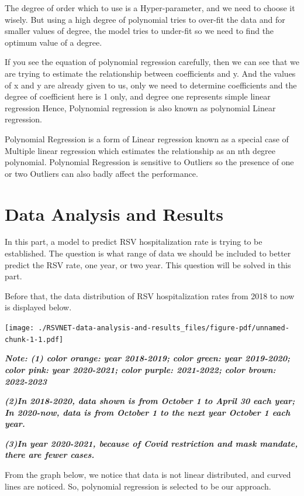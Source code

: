 \documentclass[
  letterpaper,
  DIV=11,
  numbers=noendperiod]{scrreport}
\begin{document}
The degree of order which to use is a Hyper-parameter, and we need to
choose it wisely. But using a high degree of polynomial tries to
over-fit the data and for smaller values of degree, the model tries to
under-fit so we need to find the optimum value of a degree.

If you see the equation of polynomial regression carefully, then we can
see that we are trying to estimate the relationship between coefficients
and y. And the values of x and y are already given to us, only we need
to determine coefficients and the degree of coefficient here is 1 only,
and degree one represents simple linear regression Hence, Polynomial
regression is also known as polynomial Linear regression.

Polynomial Regression is a form of Linear regression known as a special
case of Multiple linear regression which estimates the relationship as
an nth degree polynomial. Polynomial Regression is sensitive to Outliers
so the presence of one or two Outliers can also badly affect the
performance.


\hypertarget{data-analysis-and-results}{%
\chapter{Data Analysis and Results}\label{data-analysis-and-results}}

In this part, a model to predict RSV hospitalization rate is trying to
be established. The question is what range of data we should be included
to better predict the RSV rate, one year, or two year. This question
will be solved in this part.

Before that, the data distribution of RSV hospitalization rates from
2018 to now is displayed below.

\texttt{[image: ./RSVNET-data-analysis-and-results\_files/figure-pdf/unnamed-chunk-1-1.pdf]}

\textbf{\emph{Note: (1) color orange: year 2018-2019; color green: year
2019-2020; color pink: year 2020-2021; color purple: 2021-2022; color
brown: 2022-2023}}

\textbf{\emph{(2)In 2018-2020, data shown is from October 1 to April 30
each year; In 2020-now, data is from October 1 to the next year October
1 each year.}}

\textbf{\emph{(3)In year 2020-2021, because of Covid restriction and
mask mandate, there are fewer cases.}}

From the graph below, we notice that data is not linear distributed, and
curved lines are noticed. So, polynomial regression is selected to be
our approach.
\end{document}
